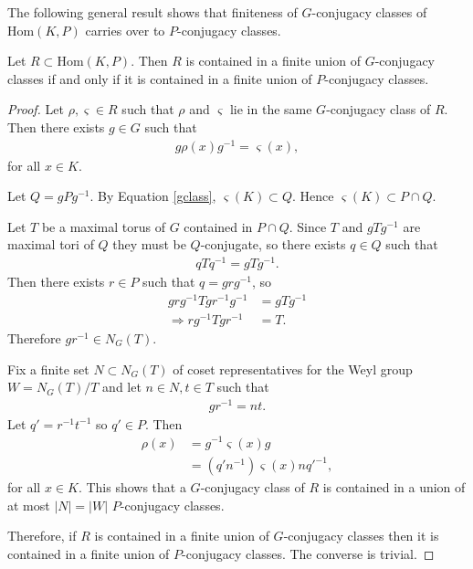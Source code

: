The following general result shows that finiteness of $G$-conjugacy classes of $\mathrm{Hom}(K, P)$ carries over to $P$-conjugacy classes. 
\begin{lemma} Let $R \subset \mathrm{Hom}(K, P)$. Then $R$ is contained in a finite union of $G$-conjugacy classes if and only if it is contained in a finite union of $P$-conjugacy classes.
  \label{lem:GPconj}
\end{lemma}
\begin{proof}
	Let $\rho, \varsigma \in R$ such that $\rho$ and $\varsigma$ lie in the same $G$-conjugacy class of $R$. Then there exists $g\in G$ such that
	\begin{align*}
		g \rho(x) g^{-1} = \varsigma(x),
	\end{align*}
for all $x \in K$.
	
	Let $Q = gPg^{-1}$. By Equation \ref{gclass}, $\varsigma(K) \subset Q$. Hence $\varsigma(K) \subset P \cap Q$.
	
	Let $T$ be a maximal torus of $G$ contained in $P\cap Q$. Since $T$ and $gTg^{-1}$ are maximal tori of $Q$ they must be $Q$-conjugate, so there exists $q\in Q$ such that
	\begin{align*}
		qTq^{-1} = gTg^{-1}.
	\end{align*}
	Then there exists $r\in P$ such that $q = grg^{-1}$, so
	\begin{align*}
		grg^{-1}Tgr^{-1}g^{-1} &= gTg^{-1} \\
		\Rightarrow rg^{-1}Tgr^{-1} &= T.
	\end{align*}
	Therefore $gr^{-1} \in N_G(T)$. 

	Fix a finite set $N \subset N_G(T)$ of coset representatives for the Weyl group $W = N_G(T)/T$ and let $n \in N, t \in T$ such that
	\begin{align*}
		gr^{-1} = nt.
	\end{align*}
	Let $q' = r^{-1}t^{-1}$ so $q' \in P$. Then
	\begin{align*}
		\rho(x) &= g^{-1} \varsigma(x) g\\
		&= (q'n^{-1}) \varsigma(x) nq'^{-1},
	\end{align*}
	for all $x \in K$.
	This shows 
	that a $G$-conjugacy class of $R$ is contained in a union of at most $|N| = |W|$ $P$-conjugacy classes.

	Therefore, if $R$ is contained in a finite union of $G$-conjugacy classes then it is contained in a finite union of $P$-conjugacy classes. The converse is trivial.
\end{proof}


